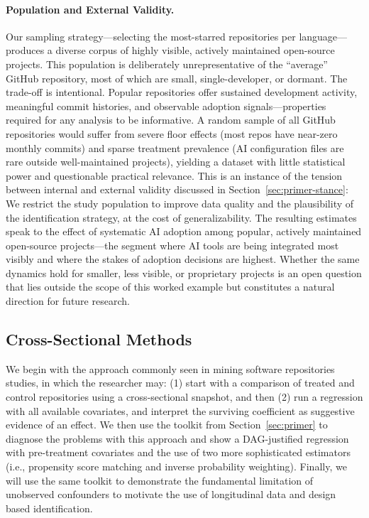 \paragraph{Population and External Validity.}
Our sampling strategy---selecting the most-starred repositories per language---produces a diverse corpus of highly visible, actively maintained open-source projects.
This population is deliberately unrepresentative of the ``average'' GitHub repository, most of which are small, single-developer, or dormant.
The trade-off is intentional.
Popular repositories offer sustained development activity, meaningful commit histories, and observable adoption signals---properties required for any analysis to be informative.
A random sample of all GitHub repositories would suffer from severe floor effects (most repos have near-zero monthly commits) and sparse treatment prevalence (AI configuration files are rare outside well-maintained projects), yielding a dataset with little statistical power and questionable practical relevance.
This is an instance of the tension between internal and external validity discussed in Section~\ref{sec:primer-stance}: We restrict the study population to improve data quality and the plausibility of the identification strategy, at the cost of generalizability.
The resulting estimates speak to the effect of systematic AI adoption among popular, actively maintained open-source projects---the segment where AI tools are being integrated most visibly and where the stakes of adoption decisions are highest.
Whether the same dynamics hold for smaller, less visible, or proprietary projects is an open question that lies outside the scope of this worked example but constitutes a natural direction for future research.

\subsection{Cross-Sectional Methods}
\label{sec:cross-sectional}

We begin with the approach commonly seen in mining software repositories studies, in which the researcher may: (1) start with a comparison of treated and control repositories using a cross-sectional snapshot, and then (2) run a regression with all available covariates, and interpret the surviving coefficient as suggestive evidence of an effect.
We then use the toolkit from Section~\ref{sec:primer} to diagnose the problems with this approach and show a DAG-justified regression with pre-treatment covariates and the use of two more sophisticated estimators (i.e., propensity score matching and inverse probability weighting).
Finally, we will use the same toolkit to demonstrate the fundamental limitation of unobserved confounders to motivate the use of longitudinal data and design based identification.

